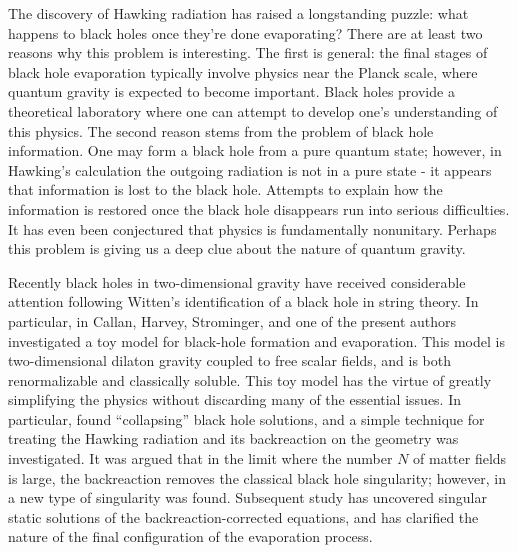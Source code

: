 
The discovery of Hawking radiation
has raised a
longstanding puzzle:  what happens to black holes once they're done
evaporating? There are at least two reasons why this problem is interesting.
The first is general:
the final stages of black hole
evaporation typically involve physics near the Planck scale, where quantum
gravity is expected to become important.  Black holes provide  a theoretical
laboratory where one can attempt to develop one's understanding of this
physics.  The second reason stems from the problem of black hole
information.
One may form a black hole from a pure quantum state;  however,
in Hawking's calculation the outgoing radiation is not in a pure state
- it
appears that
information is lost to the black hole.  Attempts to explain how the
information is restored once the black hole disappears run into serious
difficulties. It has even been conjectured that physics is fundamentally
nonunitary.  Perhaps this problem is giving us a deep clue
about the nature of quantum gravity.

Recently black holes in two-dimensional gravity have received considerable
attention following Witten's
identification of a black hole in string theory.
In particular, in  Callan, Harvey, Strominger, and one of the
present authors investigated a toy model for black-hole
formation and evaporation.
This model is two-dimensional dilaton gravity coupled to
free scalar fields, and is both renormalizable and classically soluble.
This toy model has the virtue of greatly simplifying the
physics without discarding many of the essential issues. In particular,
 found ``collapsing'' black hole solutions, and a
simple technique for treating the Hawking radiation and its backreaction on
the geometry was investigated.  It was argued that in the limit where the
number $N$ of matter fields is large, the backreaction removes
the classical black hole singularity; however, in  a new type
of singularity was found.  Subsequent study has
uncovered singular
static solutions of the backreaction-corrected equations, and
has clarified the nature of the final configuration of the
evaporation process.

